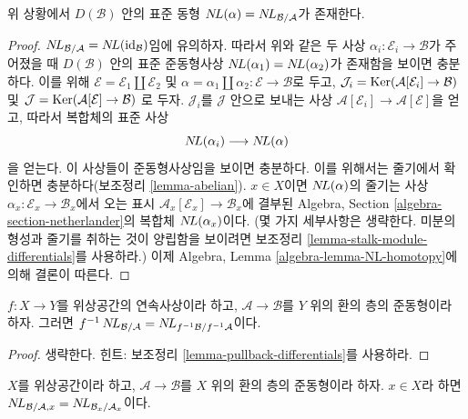 \begin{lemma}
\label{lemma-NL-up-to-qis}
위 상황에서 $D(\mathcal{B})$ 안의 표준 동형
$\mathop{N\!L}\nolimits(\alpha) = \mathop{N\!L}\nolimits_{\mathcal{B}/\mathcal{A}}$가 존재한다.
\end{lemma}

\begin{proof}
$\mathop{N\!L}\nolimits_{\mathcal{B}/\mathcal{A}} = \mathop{N\!L}\nolimits(\text{id}_\mathcal{B})$임에 유의하자.
따라서 위와 같은 두 사상 $\alpha_i : \mathcal{E}_i \to \mathcal{B}$가
주어졌을 때 $D(\mathcal{B})$ 안의 표준 준동형사상
$\mathop{N\!L}\nolimits(\alpha_1) = \mathop{N\!L}\nolimits(\alpha_2)$가 존재함을 보이면 충분하다.
이를 위해 $\mathcal{E} = \mathcal{E}_1 \amalg \mathcal{E}_2$ 및
$\alpha = \alpha_1 \amalg \alpha_2 : \mathcal{E} \to \mathcal{B}$로 두고,
$\mathcal{J}_i = \mathop{\mathrm{Ker}}(\mathcal{A}[\mathcal{E}_i] \to \mathcal{B})$
및
$\mathcal{J} = \mathop{\mathrm{Ker}}(\mathcal{A}[\mathcal{E}] \to \mathcal{B})$
로 두자. $\mathcal{J}_i$를 $\mathcal{J}$ 안으로 보내는 사상
$\mathcal{A}[\mathcal{E}_i] \to \mathcal{A}[\mathcal{E}]$을 얻고,
따라서 복합체의 표준 사상
$$
\mathop{N\!L}\nolimits(\alpha_i) \longrightarrow \mathop{N\!L}\nolimits(\alpha)
$$
을 얻는다. 이 사상들이 준동형사상임을 보이면 충분하다. 이를 위해서는
줄기에서 확인하면 충분하다(보조정리 \ref{lemma-abelian}). $x \in X$이면
$\mathop{N\!L}\nolimits(\alpha)$의 줄기는 사상
$\alpha_x : \mathcal{E}_x \to \mathcal{B}_x$에서 오는 표시
$\mathcal{A}_x[\mathcal{E}_x] \to \mathcal{B}_x$에 결부된 Algebra,
Section \ref{algebra-section-netherlander}의 복합체 $\mathop{N\!L}\nolimits(\alpha_x)$이다.
(몇 가지 세부사항은 생략한다. 미분의 형성과 줄기를 취하는 것이
양립함을 보이려면 보조정리 \ref{lemma-stalk-module-differentials}를
사용하라.) 이제 Algebra, Lemma \ref{algebra-lemma-NL-homotopy}에 의해
결론이 따른다.
\end{proof}

\begin{lemma}
\label{lemma-pullback-NL}
$f : X \to Y$를 위상공간의 연속사상이라 하고,
$\mathcal{A} \to \mathcal{B}$를 $Y$ 위의 환의 층의 준동형이라 하자.
그러면 $f^{-1}\mathop{N\!L}\nolimits_{\mathcal{B}/\mathcal{A}} =
\mathop{N\!L}\nolimits_{f^{-1}\mathcal{B}/f^{-1}\mathcal{A}}$이다.
\end{lemma}

\begin{proof}
생략한다. 힌트: 보조정리 \ref{lemma-pullback-differentials}를 사용하라.
\end{proof}

\begin{lemma}
\label{lemma-stalk-NL}
$X$를 위상공간이라 하고, $\mathcal{A} \to \mathcal{B}$를
$X$ 위의 환의 층의 준동형이라 하자. $x \in X$라 하면
$\mathop{N\!L}\nolimits_{\mathcal{B}/\mathcal{A}, x} =
\mathop{N\!L}\nolimits_{\mathcal{B}_x/\mathcal{A}_x}$이다.
\end{lemma}

